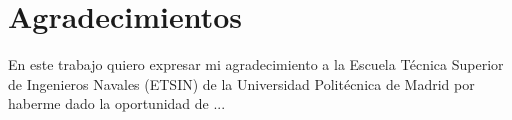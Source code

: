 \chapter*{Agradecimientos}
En este trabajo quiero expresar mi agradecimiento a la Escuela Técnica Superior de Ingenieros Navales (ETSIN) de la Universidad Politécnica de Madrid por haberme dado la oportunidad de ...


